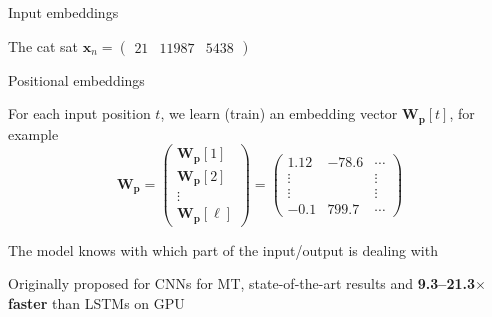 \documentclass[12pt,aspectratio=169,handout]{beamer}
\begin{document}
\begin{frame}{Input embeddings}
	
	The cat sat $\bm{x}_n =
	\begin{pmatrix}
		21 &
		11987 &
		5438
	\end{pmatrix}$
	

\end{frame}	


\begin{frame}{Positional embeddings}

For each input position $t$, we learn (train) an embedding vector $\bm{W_p}[t]$, for example
$$
\bm{W_p} =
\begin{pmatrix}
\bm{W_p}[1] \\
\bm{W_p}[2] \\
\vdots \\
\bm{W_p}[\ell]
\end{pmatrix}
=
\begin{pmatrix}
1.12 & -78.6 & \cdots \\
\vdots & & \vdots \\
\vdots & & \vdots \\
-0.1 & 799.7 & \cdots
\end{pmatrix}
$$

The model knows with which part of the input/output is dealing with

\begin{small}
Originally proposed for CNNs for MT, state-of-the-art results and \textbf{9.3--21.3$\times$ faster} than LSTMs on GPU
\end{small}



\end{frame}
\end{document}

